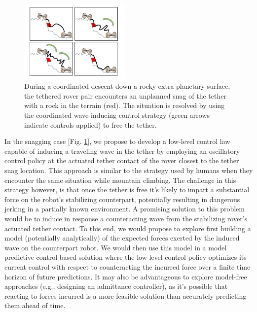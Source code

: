 \documentclass[12pt]{article}
\begin{document}
\begin{figure}
  \begin{center}
    \vspace{-0.4in}
    \includegraphics[width=0.48\textwidth, right]{tether_desnag.jpg}
  \end{center}
  \vspace{-0.4in}
  \caption{During a coordinated descent down a rocky extra-planetary surface, the tethered rover pair encounters an unplanned 
  snag of the tether with a rock in the terrain (red). The situation is resolved by using the coordinated wave-inducing control strategy (green arrows indicate controls applied) to free the tether.}
  \label{fig:tethersnag}
\end{figure}
In the snagging case [Fig. \ref{fig:tethersnag}], we propose to develop a low-level control law capable of inducing a 
traveling wave in the tether by employing 
an oscillatory control policy at the actuated tether contact of the rover closest to the tether snag location. This approach is 
similar to the strategy used by humans when they encounter the same situation while mountain climbing. 
The challenge in this strategy however, is that once the tether is free it's likely to impart a substantial 
force on the robot's stabilizing counterpart, potentially resulting in dangerous jerking in a partially known environment. 
A promising solution to this problem would be to induce in response a counteracting wave from the stabilizing rover's actuated tether 
contact. To this end, we would propose to explore first building a model (potentially analytically)
of the expected forces exerted by the induced wave on the counterpart robot. 
We would then use this model in a model predictive control-based solution where 
the low-level control policy optimizes its current control with respect to counteracting the incurred force over 
a finite time horizon of future predictions. It may also be advantageous to explore model-free approaches 
(e.g., designing an admittance controller), as it's possible that reacting to forces incurred is a more feasible 
solution than accurately predicting them ahead of time. 
\end{document}

